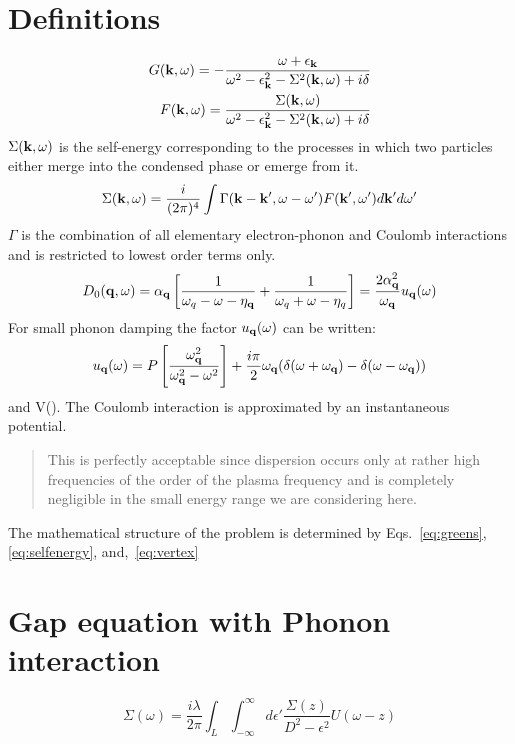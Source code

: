 \section{Definitions}
%
\begin{eqnarray}
\label{eq:greens}
G({\bf k},\omega)=-\frac{\omega + \epsilon_{{\bf k}}}{\omega^{2}-\epsilon^{2}_{{\bf k}}-\Sigma^{2}({\bf k},\omega)+i\delta}\nonumber\\
F({\bf k},\omega) = \frac{\Sigma({\bf k},\omega)}{\omega^{2}-\epsilon^{2}_{{\bf k}}-\Sigma^{2}({\bf k},\omega)+i\delta}
\end{eqnarray}
%
$\Sigma({\bf k},\omega)$ is the self-energy corresponding to the processes in which two particles either
merge into the condensed phase or emerge from it.
%
\begin{equation}
\label{eq:selfenergy}
\Sigma({\bf k},\omega) =\frac{i}{(2\pi)^{4}}\int \Gamma({\bf k}-{\bf k}',\omega-\omega')F({\bf k}',\omega')d{\bf k}'d\omega'
\end{equation}
%
$\Gamma$ is the combination of all elementary electron-phonon and Coulomb interactions and is restricted to lowest order terms only.
%
\begin{equation}
\label{eq:vertex}
D_{0}({\bf q},\omega) = \alpha_{{\bf q}}\left[ \frac{1}{\omega_{q} -\omega -\eta_{{\bf q}}} + \frac{1}{\omega_{q}+\omega-\eta_{q}} \right]= \frac{2\alpha^{2}_{{\bf q}}}{\omega_{{\bf q}}}u_{{\bf q}}(\omega)
\end{equation}
%
For small phonon damping the factor $u_{{\bf q}}(\omega)$ can be written:
%
\begin{equation}
u_{{\bf q}}(\omega) = P\left[\frac{\omega_{{\bf q}}^{2}}{\omega_{{\bf q}}^{2}-\omega^{2}}\right] + \frac{i\pi}{2}\omega_{{\bf q}}
(\delta(\omega+\omega_{{\bf q}}) - \delta(\omega-\omega_{{\bf q}}))
\end{equation}
%
and V(\q). The Coulomb interaction is approximated by an instantaneous potential.
%
\begin{quote}
This is perfectly acceptable since dispersion occurs only at rather high frequencies of the order of the plasma frequency and is completely negligible in the small energy range we are considering here.
\end{quote}
%
The mathematical structure of the problem is determined 
by Eqs.~\ref{eq:greens}, \ref{eq:selfenergy}, and,~\ref{eq:vertex}

\section{Gap equation with Phonon interaction}

\begin{equation}
\Sigma(\omega) = \frac{i \lambda}{2\pi} \int_{L}\int_{-\infty}^{\infty}d\epsilon'
\frac{\Sigma(z)}{D^{2}-\epsilon^{2}}U(\omega-z)
\end{equation}

